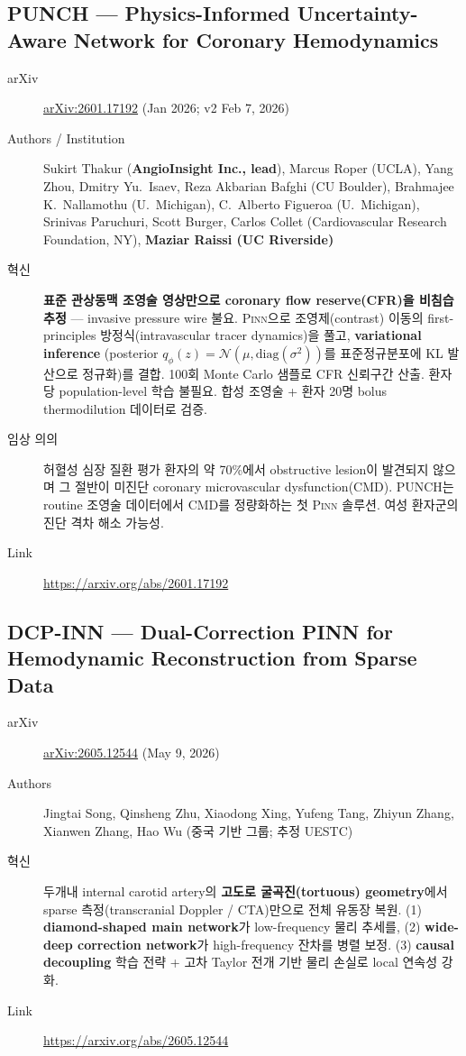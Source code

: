 \documentclass[11pt,a4paper,oneside]{report}
\newcommand{\pinn}{\textsc{Pinn}}
\newcommand{\arxivid}[1]{\href{https://arxiv.org/abs/#1}{arXiv:#1}}
\begin{document}
\subsection{PUNCH --- Physics-Informed Uncertainty-Aware Network for Coronary Hemodynamics}

\begin{description}
\item[arXiv] \arxivid{2601.17192} (Jan 2026; v2 Feb 7, 2026)
\item[Authors / Institution] Sukirt Thakur (\textbf{AngioInsight Inc., lead}), Marcus Roper (UCLA), Yang Zhou, Dmitry Yu.\ Isaev, Reza Akbarian Bafghi (CU Boulder), Brahmajee K.\ Nallamothu (U.\ Michigan), C.\ Alberto Figueroa (U.\ Michigan), Srinivas Paruchuri, Scott Burger, Carlos Collet (Cardiovascular Research Foundation, NY), \textbf{Maziar Raissi (UC Riverside)}
\item[혁신] \textbf{표준 관상동맥 조영술 영상만으로 coronary flow reserve(CFR)을 비침습 추정} --- invasive pressure wire 불요. \pinn{}으로 조영제(contrast) 이동의 first-principles 방정식(intravascular tracer dynamics)을 풀고, \textbf{variational inference} (posterior $q_\phi(z) = \mathcal{N}(\mu, \text{diag}(\sigma^2))$를 표준정규분포에 KL 발산으로 정규화)를 결합. 100회 Monte Carlo 샘플로 CFR 신뢰구간 산출. 환자당 population-level 학습 불필요. 합성 조영술 + 환자 20명 bolus thermodilution 데이터로 검증.
\item[임상 의의] 허혈성 심장 질환 평가 환자의 약 70\%에서 obstructive lesion이 발견되지 않으며 그 절반이 미진단 coronary microvascular dysfunction(CMD). PUNCH는 routine 조영술 데이터에서 CMD를 정량화하는 첫 \pinn{} 솔루션. 여성 환자군의 진단 격차 해소 가능성.
\item[Link] \url{https://arxiv.org/abs/2601.17192}
\end{description}

\subsection{DCP-INN --- Dual-Correction PINN for Hemodynamic Reconstruction from Sparse Data}

\begin{description}
\item[arXiv] \arxivid{2605.12544} (May 9, 2026)
\item[Authors] Jingtai Song, Qinsheng Zhu, Xiaodong Xing, Yufeng Tang, Zhiyun Zhang, Xianwen Zhang, Hao Wu (중국 기반 그룹; 추정 UESTC)
\item[혁신] 두개내 internal carotid artery의 \textbf{고도로 굴곡진(tortuous) geometry}에서 sparse 측정(transcranial Doppler / CTA)만으로 전체 유동장 복원. (1) \textbf{diamond-shaped main network}가 low-frequency 물리 추세를, (2) \textbf{wide-deep correction network}가 high-frequency 잔차를 병렬 보정. (3) \textbf{causal decoupling} 학습 전략 + 고차 Taylor 전개 기반 물리 손실로 local 연속성 강화.
\item[Link] \url{https://arxiv.org/abs/2605.12544}
\end{description}
\end{document}
